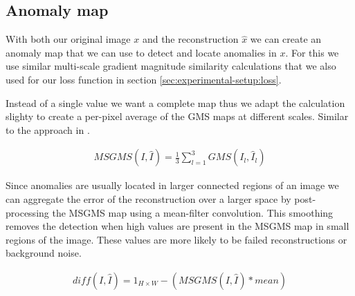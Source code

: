 \subsection{Anomaly map}

With both our original image $x$ and the reconstruction $\hat{x}$ we can create an anomaly map that we can use to detect and locate anomalies in $x$. For this we use similar multi-scale gradient magnitude similarity calculations that we also used for our loss function in section \ref{sec:experimental-setup:loss}.

Instead of a single value we want a complete map thus we adapt the calculation slighty to create a per-pixel average of the GMS maps at different scales. Similar to the approach in \cite{pirnay_inpainting_2021, zavrtanik_reconstruction_2021}.

\begin{align}
MSGMS(I, \hat{I}) = \frac{1}{3} \sum_{l=1}^{3} {GMS(I_l, \hat{I}_l)}
\end{align}

Since anomalies are usually located in larger connected regions of an image we can aggregate the error of the reconstruction over a larger space by post-processing the MSGMS map using a mean-filter convolution. This smoothing removes the detection when high values are present in the MSGMS map in small regions of the image. These values are more likely to be failed reconstructions or background noise.

\begin{align}
diff(I, \hat{I}) = 1_{H \times W} - (MSGMS(I, \hat{I}) \ast mean)
\end{align}






